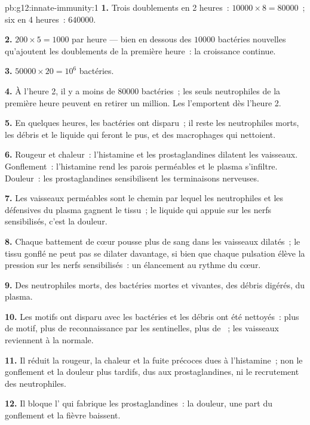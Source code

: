 \begin{solution}{pb:g12:innate-immunity:1}
\textbf{1.} Trois doublements en 2 heures~: $\num{10000} \times 8 =
\num{80000}$~; six en 4 heures~: $\num{640000}$.

\textbf{2.} $200 \times 5 = 1000$ par heure --- bien en dessous des
$\num{10000}$ bactéries nouvelles qu'ajoutent les doublements de la
première heure~: la croissance continue.

\textbf{3.} $\num{50000} \times 20 = 10^6$ bactéries.

\textbf{4.} À l'heure 2, il y a moins de $\num{80000}$ bactéries~; les
seuls neutrophiles de la première heure peuvent en retirer un million.
Les  l'emportent dès l'heure 2.

\textbf{5.} En quelques heures, les bactéries ont disparu~; il reste
les neutrophiles morts, les débris et le liquide qui feront le pus, et
des macrophages qui nettoient.

\textbf{6.} Rougeur et chaleur~: l'histamine et les prostaglandines
dilatent les vaisseaux. Gonflement~: l'histamine rend les parois
perméables et le plasma s'infiltre. Douleur~: les prostaglandines
sensibilisent les terminaisons nerveuses.

\textbf{7.} Les vaisseaux perméables sont le chemin par lequel les
neutrophiles et les  défensives du plasma gagnent le tissu~;
le liquide qui appuie sur les nerfs sensibilisés, c'est la douleur.

\textbf{8.} Chaque battement de cœur pousse plus de sang dans les
vaisseaux dilatés~; le tissu gonflé ne peut pas se dilater davantage,
si bien que chaque pulsation élève la pression sur les nerfs
sensibilisés~: un élancement au rythme du cœur.

\textbf{9.} Des neutrophiles morts, des bactéries mortes et vivantes,
des débris digérés, du plasma.

\textbf{10.} Les motifs ont disparu avec les bactéries et les débris
ont été nettoyés~: plus de motif, plus de reconnaissance par les
sentinelles, plus de ~; les vaisseaux reviennent à la
normale.

\textbf{11.} Il réduit la rougeur, la chaleur et la fuite précoces
dues à l'histamine~; non le gonflement et la douleur plus tardifs, dus
aux prostaglandines, ni le recrutement des neutrophiles.

\textbf{12.} Il bloque l' qui fabrique les prostaglandines~: la
douleur, une part du gonflement et la fièvre baissent.


\end{solution}
